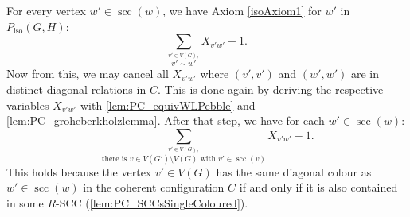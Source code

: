\documentclass[10pt,a4paper]{article}
\newcommand{\scc}{{\operatorname{scc}}}
\newcommand{\Piso}{P_{\text{iso}}}
\begin{document}
	For every vertex $w' \in \scc(w)$, we have Axiom \eqref{isoAxiom1} for $w'$ in $\Piso(G,H)$:
	\[
	\sum_{\stackrel{v' \in V(G),}{ v' \sim w'}} X_{v'w'} - 1.
	\]
	Now from this, we may cancel all $X_{v'w'}$ where $(v',v')$ and $(w',w')$ are in distinct diagonal relations in $C$. This is done again by deriving the respective variables $X_{v'w'}$ with \autoref{lem:PC_equivWLPebble} and \autoref{lem:PC_groheberkholzlemma}. After that step, we have for each $w' \in \scc(w)$:
	\[
	\sum_{\stackrel{v' \in V(G),}{ \text{there is } v \in V(G') \setminus V(G) \text{ with } v' \in \scc(v) }} X_{v'w'} - 1.   \tag{$\star$}
	\]
	This holds because the vertex $v' \in V(G)$ has the same diagonal colour as $w' \in \scc(w)$ in the coherent configuration $C$ if and only if it is also contained in some $R$-SCC (\autoref{lem:PC_SCCsSingleColoured}).\\
	
\end{document}
